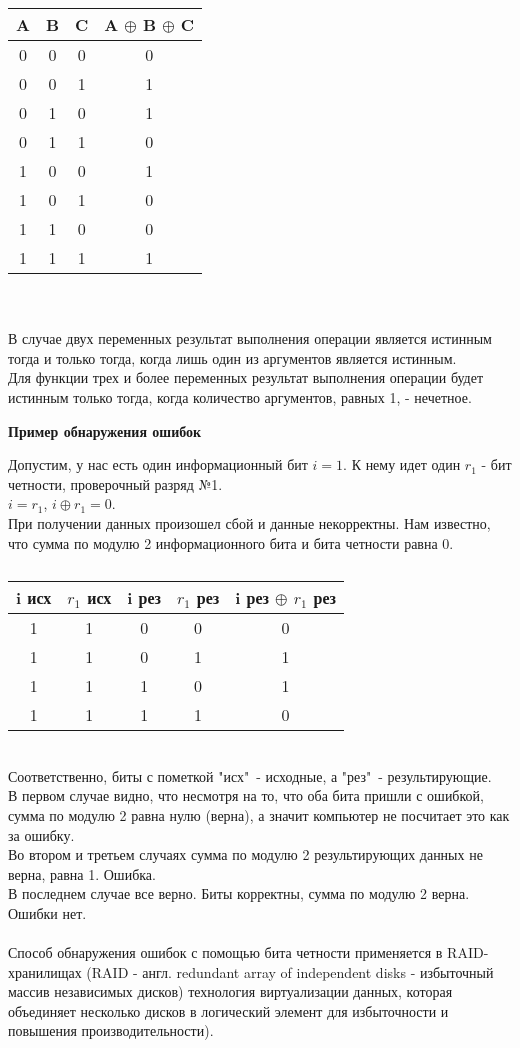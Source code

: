 \begin{minipage}[l]{6cm}
\begin{tabular}{|c|c|c|c|}
\hline
A & B & C & A $\oplus$ B $\oplus$ C\\
\hline
0 & 0 & 0 & 0 \\
0 & 0 & 1 & 1 \\
0 & 1 & 0 & 1 \\
0 & 1 & 1 & 0 \\
1 & 0 & 0 & 1 \\
1 & 0 & 1 & 0 \\
1 & 1 & 0 & 0 \\
1 & 1 & 1 & 1 \\
\hline
\end{tabular}
\end{minipage}
\\
\\В случае двух переменных результат выполнения операции является истинным тогда и только тогда, когда лишь один из аргументов является истинным.
\\Для функции трех и более переменных результат выполнения операции будет истинным только тогда, когда количество аргументов, равных 1, - нечетное.
\begin{center}
  \textbf{Пример обнаружения ошибок}
\end{center}
Допустим, у нас есть один информационный бит $i = 1$. К нему идет один $r_1$ - бит четности, проверочный разряд №1.
\\$i = r_1$, $i \oplus r_1 = 0$.
\\При получении данных произошел сбой и данные некорректны. Нам известно, что сумма по модулю 2 информационного бита и бита четности равна 0.
\begin{table}[h]
\caption{}
\begin{tabular}{|c|c|c|c|c|}
\hline
i исх & $r_{1}$ исх & i рез & $r_{1}$ рез & i рез $\oplus$ $r_{1}$ рез \\
\hline
1 & 1 & 0 & 0 & 0 \\
1 & 1 & 0 & 1 & 1 \\
1 & 1 & 1 & 0 & 1 \\
1 & 1 & 1 & 1 & 0 \\
\hline
\end{tabular}
\end{table}
\\Соответственно, биты с пометкой "исх"\ - исходные, а "рез"\ - результирующие.
\\В первом случае видно, что несмотря на то, что оба бита пришли с ошибкой, сумма по модулю 2 равна нулю (верна), а значит компьютер не посчитает это как за ошибку.
\\Во втором и третьем случаях сумма по модулю 2 результирующих данных не верна, равна 1. Ошибка.
\\В последнем случае все верно. Биты корректны, сумма по модулю 2 верна. Ошибки нет.
\\
\\Способ обнаружения ошибок с помощью бита четности применяется в RAID-хранилищах (RAID - англ. redundant array of independent disks - избыточный массив независимых дисков) технология виртуализации данных, которая объединяет несколько дисков в логический элемент для избыточности и повышения производительности).

